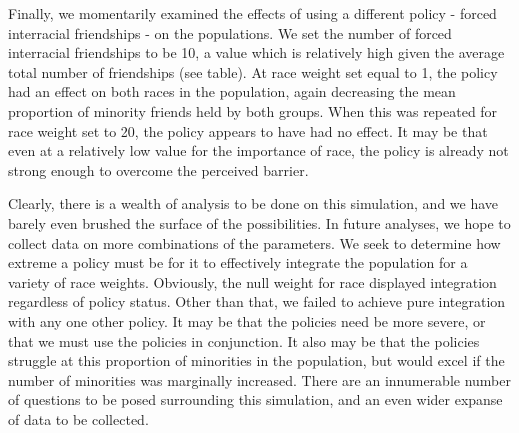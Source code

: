 
Finally, we momentarily examined the effects of using a different policy - forced interracial friendships - on the 
populations. We set the number of forced interracial friendships to be 10, a value which is relatively high given the average total number of friendships (see table). At race weight 
set equal to 1, the policy had an effect on both races in the population, again decreasing the mean proportion of minority friends held by both groups. When this was repeated for race 
weight set to 20, the policy appears to have had no effect. It may be that even at a relatively low value for the importance of race, the policy is already not strong enough to overcome 
the perceived barrier.

Clearly, there is a wealth of analysis to be done on this simulation, and we have barely even brushed the surface of the 
possibilities. In future analyses, we hope to collect data on more combinations of the parameters. We seek to determine how 
extreme a policy must be for it to effectively integrate the population for a variety of race weights. Obviously, the null 
weight for race displayed integration regardless of policy status. Other than that, we failed to achieve pure integration 
with any one other policy. It may be that the policies need be more severe, or that we must use the policies in 
conjunction. It also may be that the policies struggle at this proportion of minorities in the population, but would 
excel if the number of minorities was marginally increased. There are an innumerable number of questions to be posed 
surrounding this simulation, and an even wider expanse of data to be collected.
